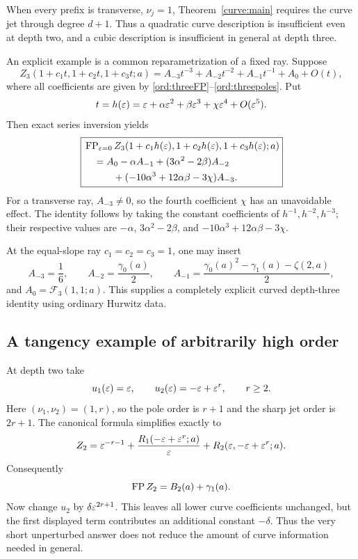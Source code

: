 When every prefix is transverse, $\nu_j=1$, Theorem~\ref{curve:main}
requires the curve jet through degree $d+1$. Thus a quadratic curve
description is insufficient even at depth two, and a cubic description
is insufficient in general at depth three.

An explicit example is a common reparametrization of a fixed ray.
Suppose
\[
 Z_3(1+c_1t,1+c_2t,1+c_3t;a)
 =A_{-3}t^{-3}+A_{-2}t^{-2}+A_{-1}t^{-1}+A_0+O(t),
\]
where all coefficients are given by
\eqref{ord:threeFP}--\eqref{ord:threepoles}. Put
\[
 t=h(\varepsilon)=\varepsilon+\alpha\varepsilon^2+\beta\varepsilon^3+
                         \chi\varepsilon^4+O(\varepsilon^5).
\]
Then exact series inversion yields
\begin{equation}\label{curve:cubicreparam}
 \boxed{\begin{aligned}
 &\operatorname{FP}_{\varepsilon=0}Z_3(1+c_1h(\varepsilon),1+c_2h(\varepsilon),1+c_3h(\varepsilon);a)\\
 &\quad=A_0-\alpha A_{-1}+(3\alpha^2-2\beta)A_{-2}\\
 &\qquad\quad+(-10\alpha^3+12\alpha\beta-3\chi)A_{-3}.
 \end{aligned}}
\end{equation}
For a transverse ray, $A_{-3}\ne0$, so the fourth coefficient $\chi$
has an unavoidable effect. The identity follows by taking the
constant coefficients of $h^{-1},h^{-2},h^{-3}$; their respective
values are $-\alpha$, $3\alpha^2-2\beta$, and
$-10\alpha^3+12\alpha\beta-3\chi$.

At the equal-slope ray $c_1=c_2=c_3=1$, one may insert
\[
 A_{-3}=\frac16,\qquad A_{-2}=\frac{\gamma_0(a)}2,\qquad
 A_{-1}=\frac{\gamma_0(a)^2-\gamma_1(a)-\zeta(2,a)}2,
\]
and $A_0=\mathcal F_3(1,1;a)$. This supplies a completely explicit
curved depth-three identity using ordinary Hurwitz data.

\subsection{A tangency example of arbitrarily high order}

At depth two take
\[
 u_1(\varepsilon)=\varepsilon,\qquad u_2(\varepsilon)=-\varepsilon+\varepsilon^r,
 \qquad r\ge2.
\]
Here $(\nu_1,\nu_2)=(1,r)$, so the pole order is $r+1$ and the
sharp jet order is $2r+1$. The canonical formula simplifies exactly to
\[
 Z_2=\varepsilon^{-r-1}+\frac{R_1(-\varepsilon+\varepsilon^r;a)}{\varepsilon}
                  +R_2(\varepsilon,-\varepsilon+\varepsilon^r;a).
\]
Consequently
\begin{equation}\label{curve:tangentexample}
 \operatorname{FP} Z_2=B_2(a)+\gamma_1(a).
\end{equation}
Now change $u_2$ by $\delta\varepsilon^{2r+1}$. This leaves all lower curve
coefficients unchanged, but the first displayed term contributes an
additional constant $-\delta$. Thus the very short unperturbed answer
does not reduce the amount of curve information needed in general.

